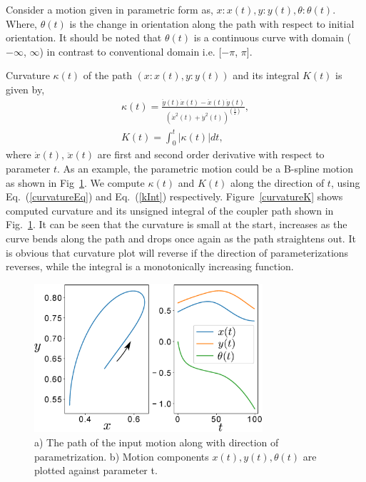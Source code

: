 \documentclass[twocolumn,10pt]{asme2ej}
\newcommand{\req}[1]{(\ref{#1})}
\begin{document}
Consider a motion given in parametric form as, $x:x(t), y:y(t), \theta:\theta(t)$.
Where, $\theta(t)$ is the change in orientation along the path with respect to initial orientation.
It should be noted that $\theta(t)$ is a continuous curve with domain ($-\infty$, $\infty$) in contrast to conventional domain i.e. [$-\pi$, $\pi$].

Curvature $\kappa(t)$ of the path $(x:x(t), y:y(t))$ and its integral $K(t)$ is given by,
\begin{eqnarray}
  \kappa(t) = \frac{\ddot{y}(t)\dot{x}(t) - \ddot{x}(t)\dot{y}(t)}{{(\dot{x}^2(t) + \dot{y}^2(t))}^{(\frac 32)}}, \label{curvatureEq}\\
  K(t) = \int^{t}_0 |\kappa(t)|dt \label{kInt},
\end{eqnarray}
where $\dot{x}(t)$, $\ddot{x}(t)$ are first and second order derivative with respect to parameter $t$.
As an example, the parametric motion could be a B-spline motion as shown in Fig~\ref{bsplineFitting}.
We compute $\kappa(t)$ and $K(t)$ along the direction of $t$, using Eq.~\req{curvatureEq} and Eq.~\req{kInt} respectively.
Figure~\ref{curvatureK} shows computed curvature and its unsigned integral of the coupler path shown in Fig.~\ref{bsplineFitting}.
It can be seen that the curvature is small at the start, increases as the curve bends along the path and drops once again as the path straightens out. It is obvious that curvature plot will reverse if the direction of parameterizations reverses, while the integral is a monotonically increasing function.

\begin{figure}
\centering
\includegraphics[width=240pt]{figure/fig_bspline.eps}
  \caption{a) The path of the input motion along with direction of parametrization. b) Motion components $x(t), y(t), \theta(t)$ are plotted against parameter t.}
\label{bsplineFitting}
\end{figure}
\end{document}

